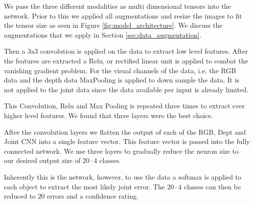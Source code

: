 We pass the three different modalities as multi dimensional tensors into the network. Prior to this we applied all augmentations and resize the images to fit the tensor size as seen in Figure \ref{fig:model_architecture}. We discuss the augmentations that we apply in Section \ref{sec:data_augmentation}.

Then a 3x3 convolution is applied on the data to extract low level features. After the features are extracted a Relu, or rectified linear unit is applied to combat the vanishing gradient problem. For the visual channels of the data, i.e. the RGB data and the depth data MaxPooling is applied to down sample the data. It is not applied to the joint data since the data available per input is already limited.

This Convolution, Relu and Max Pooling is repeated three times to extract ever higher level features. We found that three layers were the best choice.

After the convolution layers we flatten the output of each of the RGB, Dept and Joint CNN into a single feature vector. This feature vector is passed into the fully connected network. We use three layers to gradually reduce the neuron size to our desired output size of $20\cdot4$ classes.

Inherently this is the network, however, to use the data a softmax is applied to each object to extract the most likely joint error. The $20\cdot4$ classes can then be reduced to $20$ errors and a confidence rating.